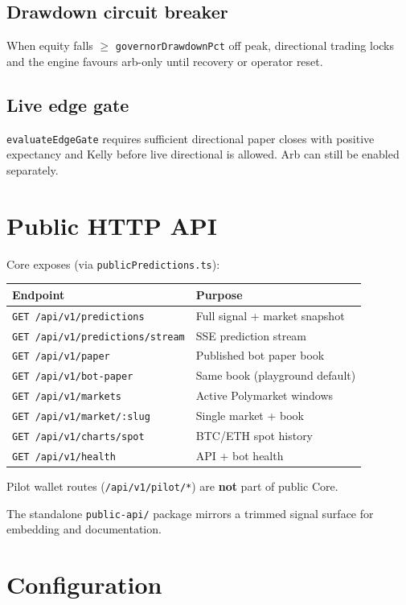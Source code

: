 \documentclass[11pt,a4paper]{report}
\begin{document}
\section{Drawdown circuit breaker}

When equity falls $\geq$ \texttt{governorDrawdownPct} off peak, directional trading locks
and the engine favours arb-only until recovery or operator reset.

\section{Live edge gate}

\texttt{evaluateEdgeGate} requires sufficient directional paper closes with positive
expectancy and Kelly before live directional is allowed. Arb can still be enabled separately.

\chapter{Public HTTP API}

Core exposes (via \texttt{publicPredictions.ts}):

\begin{longtable}{@{}lp{9cm}@{}}
\toprule
Endpoint & Purpose \\
\midrule
\endhead
\texttt{GET /api/v1/predictions} & Full signal + market snapshot \\
\texttt{GET /api/v1/predictions/stream} & SSE prediction stream \\
\texttt{GET /api/v1/paper} & Published bot paper book \\
\texttt{GET /api/v1/bot-paper} & Same book (playground default) \\
\texttt{GET /api/v1/markets} & Active Polymarket windows \\
\texttt{GET /api/v1/market/:slug} & Single market + book \\
\texttt{GET /api/v1/charts/spot} & BTC/ETH spot history \\
\texttt{GET /api/v1/health} & API + bot health \\
\bottomrule
\end{longtable}

Pilot wallet routes (\texttt{/api/v1/pilot/*}) are \textbf{not} part of public Core.

The standalone \texttt{public-api/} package mirrors a trimmed signal surface for
embedding and documentation.

\chapter{Configuration}
\end{document}
